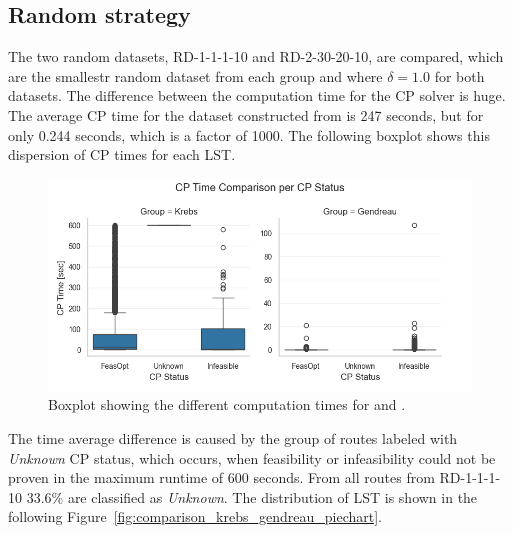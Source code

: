 \subsection{Random strategy}
\label{subsec:challenges_krebs_random}

The two random datasets, RD-1-1-1-10 and RD-2-30-20-10, are compared, which are the smallestr random dataset from each group and
where $\delta = 1.0$ for both datasets. The difference between the computation time for the \gls{CP} solver is huge. The average
\gls{CP} time for the dataset constructed from \krebsADataSetText is 247 seconds, but for \gendreauDataSetText only 0.244 seconds,
which is a factor of 1000. The following boxplot shows this dispersion of \gls{CP} times for each \gls{LST}.
\begin{figure}[ht]
    \centering
    \includegraphics[width=\textwidth]{pictures/comparison_krebs_gendreau/boxplot_cp_time.png}
    \caption{Boxplot showing the different computation times for \krebsADataSetText and \gendreauDataSet.}
    \label{fig:comparison_krebs_gendreau_boxplot}
\end{figure}

The time average difference is caused by the group of routes labeled with \textit{Unknown} \gls{CP} status, which occurs, when
feasibility or infeasibility could not be proven in the maximum runtime of 600 seconds. From all routes from RD-1-1-1-10
33.6\% are classified as \textit{Unknown}. The distribution of \gls{LST} is shown in the following Figure~\ref{fig:comparison_krebs_gendreau_piechart}.

